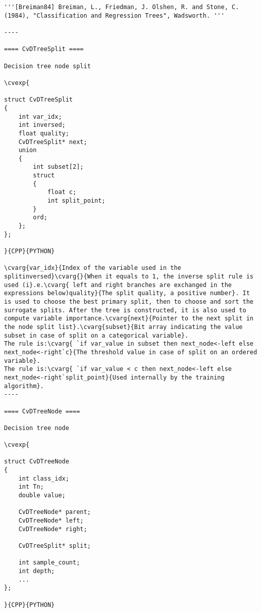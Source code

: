 \begin{verbatim}
'''[Breiman84] Breiman, L., Friedman, J. Olshen, R. and Stone, C. (1984), "Classification and Regression Trees", Wadsworth. '''

----

==== CvDTreeSplit ====

Decision tree node split

\cvexp{

struct CvDTreeSplit
{
    int var_idx;
    int inversed;
    float quality;
    CvDTreeSplit* next;
    union
    {
        int subset[2];
        struct
        {
            float c;
            int split_point;
        }
        ord;
    };
};

}{CPP}{PYTHON}

\cvarg{var_idx}{Index of the variable used in the splitinversed}\cvarg{}{When it equals to 1, the inverse split rule is used (i}.e.\cvarg{ left and right branches are exchanged in the expressions below)quality}{The split quality, a positive number}. It is used to choose the best primary split, then to choose and sort the surrogate splits. After the tree is constructed, it is also used to compute variable importance.\cvarg{next}{Pointer to the next split in the node split list}.\cvarg{subset}{Bit array indicating the value subset in case of split on a categorical variable}.
The rule is:\cvarg{ `if var_value in subset then next_node<-left else next_node<-right`c}{The threshold value in case of split on an ordered variable}.
The rule is:\cvarg{ `if var_value < c then next_node<-left else next_node<-right`split_point}{Used internally by the training algorithm}.
----

==== CvDTreeNode ====

Decision tree node

\cvexp{

struct CvDTreeNode
{
    int class_idx;
    int Tn;
    double value;

    CvDTreeNode* parent;
    CvDTreeNode* left;
    CvDTreeNode* right;

    CvDTreeSplit* split;

    int sample_count;
    int depth;
    ...
};

}{CPP}{PYTHON}


\end{verbatim}
